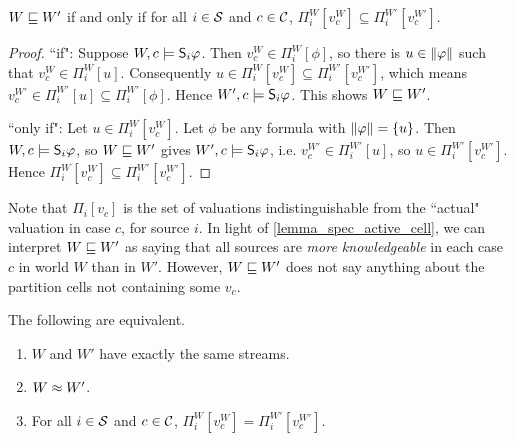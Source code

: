 
\begin{lemma}
    \label{lemma_spec_active_cell}
    $W \specleq W'$ if and only if for all $i \in \srcs$ and $c \in \css$,
    $\Pi^W_i[v^W_c] \subseteq \Pi^{W'}_i[v^{W'}_c]$.
\end{lemma}

\begin{proof}
    ``if": Suppose $W, c \models \S_i\phi$. Then $v^W_c \in \Pi^W_i[\phi]$, so
    there is $u \in \propmods{\phi}$ such that $v^W_c \in \Pi^W_i[u]$.
    Consequently $u \in \Pi^W_i[v^W_c] \subseteq \Pi^{W'}_i[v^{W'}_c]$, which
    means $v^{W'}_c \in \Pi^{W'}_i[u] \subseteq \Pi^{W'}_i[\phi]$. Hence $W', c
    \models \S_i\phi$. This shows $W \specleq W'$.

    ``only if": Let $u \in \Pi^W_i[v^W_c]$. Let $\phi$ be any formula with
    $\propmods{\phi} = \{u\}$. Then $W, c \models \S_i\phi$, so $W \specleq W'$
    gives $W', c \models \S_i\phi$, i.e. $v^{W'}_c \in \Pi^{W'}_i[u]$, so $u
    \in \Pi^{W'}_i[v^{W'}_c]$. Hence $\Pi^W_i[v^W_c] \subseteq
    \Pi^{W'}_i[v^{W'}_c]$.
\end{proof}

Note that $\Pi_i[v_c]$ is the set of valuations indistinguishable from the
``actual" valuation in case $c$, for source $i$. In light of
\cref{lemma_spec_active_cell}, we can interpret $W \specleq W'$ as saying that
all sources are \emph{more knowledgeable} in each case $c$ in world $W$ than in
$W'$. However, $W \specleq W'$ does not say anything about the partition cells
not containing some $v_c$.

\begin{proposition}
    \label{prop_speceq_equivalent_conditions}
    The following are equivalent.
    \begin{enumerate}
        \item\label{item_same_streams} $W$ and $W'$ have exactly the same
            streams.
        \item\label{item_speceq} $W \speceq W'$.
        \item\label{item_active_cells_equal} For all $i \in \srcs$ and $c \in
            \css$, $\Pi^W_i[v^W_c] = \Pi^{W'}_i[v^{W'}_c]$.
    \end{enumerate}
\end{proposition}

